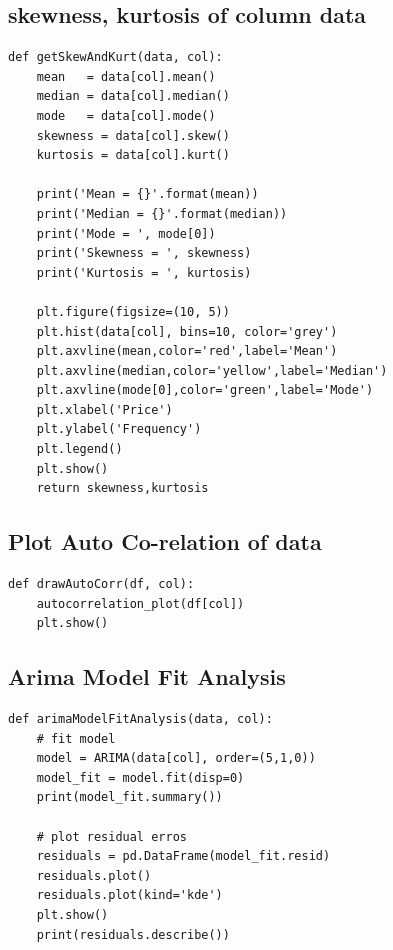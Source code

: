 \documentclass[a4paper,10pt]{article}
\begin{document}
\subsection{skewness, kurtosis of column data }
\begin{lstlisting}
def getSkewAndKurt(data, col):
    mean   = data[col].mean()
    median = data[col].median()
    mode   = data[col].mode()
    skewness = data[col].skew()
    kurtosis = data[col].kurt()
    
    print('Mean = {}'.format(mean))
    print('Median = {}'.format(median))
    print('Mode = ', mode[0])
    print('Skewness = ', skewness)
    print('Kurtosis = ', kurtosis)
    
    plt.figure(figsize=(10, 5))
    plt.hist(data[col], bins=10, color='grey')
    plt.axvline(mean,color='red',label='Mean')
    plt.axvline(median,color='yellow',label='Median')
    plt.axvline(mode[0],color='green',label='Mode')
    plt.xlabel('Price')
    plt.ylabel('Frequency')
    plt.legend()
    plt.show()
    return skewness,kurtosis
\end{lstlisting}

\subsection{Plot Auto Co-relation of data}
\begin{lstlisting}
def drawAutoCorr(df, col):
    autocorrelation_plot(df[col])
    plt.show()
\end{lstlisting}

\subsection{Arima Model Fit Analysis}
\begin{lstlisting}
def arimaModelFitAnalysis(data, col):
    # fit model
    model = ARIMA(data[col], order=(5,1,0))
    model_fit = model.fit(disp=0)
    print(model_fit.summary())
    
    # plot residual erros
    residuals = pd.DataFrame(model_fit.resid)
    residuals.plot()
    residuals.plot(kind='kde')
    plt.show()
    print(residuals.describe())
\end{lstlisting}
\end{document}
